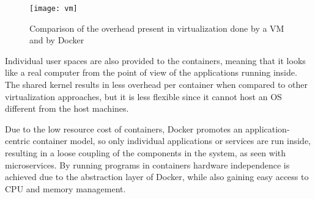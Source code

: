  \begin{figure}[ht]
    \myfloatalign
    \texttt{[image: vm]}
    \caption[Comparison of \aclp{VM} and Docker]{Comparison of the overhead present in virtualization done by a \acl{VM} and by Docker}
    \label{fig:vm_vs_container}
\end{figure}
 
 Individual user spaces are also provided to the containers, meaning that it looks like a real computer from the point of view of the applications running inside.
The shared kernel results in less overhead per container when compared to other virtualization approaches, but it is less flexible since it cannot host an \ac{OS} different from the host machines.

Due to the low resource cost of containers, Docker promotes an application-centric container model\cite{merkel2014docker}, so only individual applications or services are run inside, resulting in a loose coupling of the components in the system, as seen with microservices. 
By running programs in containers hardware independence is achieved due to the abstraction layer of Docker, while also gaining easy access to \ac{CPU} and memory management.

